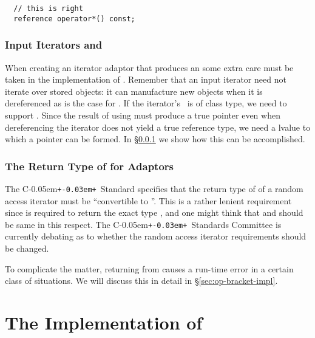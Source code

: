 \documentclass{netobjectdays}
\newcommand{\Cpp}{C\kern-0.05em\texttt{+\kern-0.03em+}}
\newcommand{\iteratoradaptor}{\code{iterator\_\-adaptor}}
\newcommand{\valuetype}{\code{value\_\-type}}
\begin{document}
{\footnotesize
\begin{verbatim}
  // this is right
  reference operator*() const;
\end{verbatim}
}


\subsubsection{Input Iterators and }
\label{sec:operator-arrow}

When creating an iterator adaptor that produces an
 some extra care must be taken in the
implementation of . Remember that an input iterator
need not iterate over stored objects: it can manufacture new objects
when it is dereferenced as is the case for
. If the iterator's \valuetype\ is
of class type, we need to support . Since the result
of using  must produce a true pointer even when
dereferencing the iterator does not yield a true reference type, we
need a  lvalue to which a pointer can be formed.  In
\S\ref{sec:operator-arrow} we show how this can be accomplished.


\subsubsection{The Return Type of  for Adaptors}
\label{sec:operator-bracket}

The \Cpp\ Standard specifies that the return type of 
of a random access iterator must be ``convertible to ''.  This
is a rather lenient requirement since  is required to
return the exact type , and one might think that
 and  should be same in this respect.
The \Cpp\ Standards Committee is currently debating as to whether the
random access iterator requirements should be changed.

To complicate the matter, returning  from 
causes a run-time error in a certain class of situations. We will
discuss this in detail in \S\ref{sec:op-bracket-impl}.




\section{The Implementation of \iteratoradaptor{}}
\end{document}
